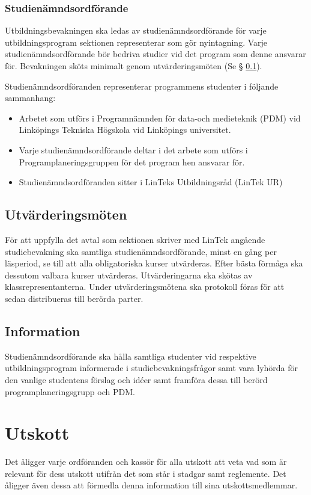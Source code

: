 \documentclass{datateknologsektionen-document}
\begin{document}
\subsubsection{Studienämndsordförande}
\label{snordf}
Utbildningsbevakningen ska ledas av studienämndsordförande för varje utbildningsprogram
sektionen representerar som gör nyintagning. Varje studienämndsordförande bör bedriva
studier vid det program som denne ansvarar för. Bevakningen sköts minimalt genom
utvärderingsmöten (Se § \ref{utvarderingsmoten}).

Studienämndsordföranden representerar programmens studenter i följande sammanhang:
\begin{itemize}
  \item Arbetet som utförs i Programnämnden för data-och medieteknik (PDM) vid Linköpings Tekniska Högskola vid Linköpings universitet.
  \item Varje studienämndsordförande deltar i det arbete som utförs i Programplaneringsgruppen för det program hen ansvarar för.
  \item Studienämndsordföranden sitter i LinTeks Utbildningsråd (LinTek UR)
\end{itemize}
\subsection{Utvärderingsmöten}
\label{utvarderingsmoten}
För att uppfylla det avtal som sektionen skriver med LinTek angående studiebevakning ska
samtliga studienämndsordförande, minst en gång per läsperiod, se till att alla obligatoriska kurser
utvärderas. Efter bästa förmåga ska dessutom valbara kurser utvärderas. Utvärderingarna ska
skötas av klassrepresentanterna. Under utvärderingsmötena ska protokoll föras för att sedan
distribueras till berörda parter.
\subsection{Information}
Studienämndsordförande ska hålla samtliga studenter vid respektive utbildningsprogram
informerade i studiebevakningsfrågor samt vara lyhörda för den vanlige studentens förslag och
idéer samt framföra dessa till berörd programplaneringsgrupp och PDM.
\section{Utskott}
Det åligger varje ordföranden och kassör för alla utskott att veta vad som är relevant för dess
utskott utifrån det som står i stadgar samt reglemente. Det åligger även dessa att förmedla denna
information till sina utskottsmedlemmar.
\end{document}
